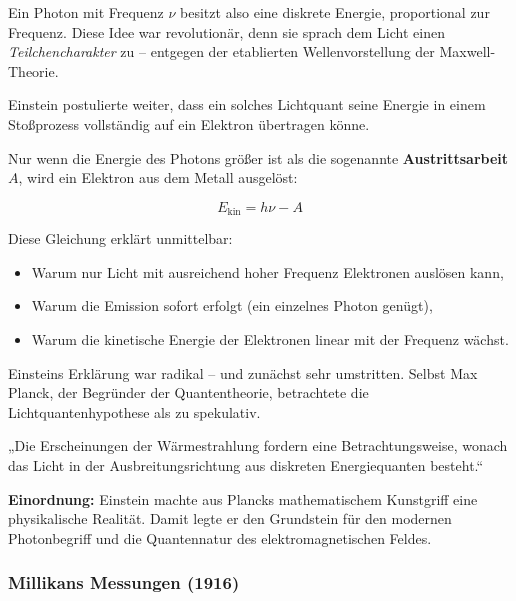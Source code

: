 Ein Photon mit Frequenz \( \nu \) besitzt also eine diskrete Energie, proportional zur Frequenz. Diese Idee war revolutionär, denn sie sprach dem Licht einen \emph{Teilchencharakter} zu – entgegen der etablierten Wellenvorstellung der Maxwell-Theorie.

Einstein postulierte weiter, dass ein solches Lichtquant seine Energie in einem Stoßprozess vollständig auf ein Elektron übertragen könne. 

Nur wenn die Energie des Photons größer ist als die sogenannte \textbf{Austrittsarbeit} \( A \), wird ein Elektron aus dem Metall ausgelöst:

\[
E_{\text{kin}} = h \nu - A
\]

Diese Gleichung erklärt unmittelbar:
\begin{itemize}
	\item Warum nur Licht mit ausreichend hoher Frequenz Elektronen auslösen kann,
	\item Warum die Emission sofort erfolgt (ein einzelnes Photon genügt),
	\item Warum die kinetische Energie der Elektronen linear mit der Frequenz wächst.
\end{itemize}

Einsteins Erklärung war radikal – und zunächst sehr umstritten. Selbst Max Planck, der Begründer der Quantentheorie, betrachtete die Lichtquantenhypothese als zu spekulativ.

\vspace{1em}
\begin{tcolorbox}[physikbox, title=Albert Einstein (1905)\textit{ \cite{einstein1905}} ]
	\label{die Erscheinung der Wärm}
	\small
	„Die Erscheinungen der Wärmestrahlung fordern eine Betrachtungsweise, wonach das Licht in der Ausbreitungsrichtung aus diskreten Energiequanten besteht.“
\end{tcolorbox}
\vspace{1em}
\textbf{Einordnung:} Einstein machte aus Plancks mathematischem Kunstgriff eine physikalische Realität. Damit legte er den Grundstein für den modernen Photonbegriff und die Quantennatur des elektromagnetischen Feldes.

\subsubsection{Millikans Messungen (1916)}

